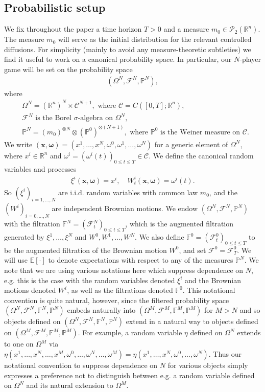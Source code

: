 \documentclass[11pt,reqno]{amsart}
\numberwithin{equation}{section}
\theoremstyle{definition}
\def\E{{\mathbb E}}
\def\R{{\mathbb R}}
\newcommand{\bx}{\mathbf{x}}
\newcommand{\bP}{\mathbb{P}}
\newcommand{\spt}{\mathcal{P}_2(\R^n)}
\newcommand{\sF}{\mathcal{F}}
\newcommand{\bbF}{\mathbb{F}}
\newcommand\cC{\mathcal C}
\def \E{\mathbb{E}}
\def \R{\mathbb{R}}
\begin{document}
\subsection{Probabilistic setup}
\label{subsec:probsetup}
We fix throughout the paper a time horizon $T > 0$ and a measure $m_0 \in \spt$. The measure $m_0$ will serve as the initial distribution for the relevant controlled diffusions. For simplicity (mainly to avoid any measure-theoretic subtleties) we find it useful to work on a canonical probability space. In particular, our $N$-player game will be set on the probability space 
\begin{align*}
(\Omega^N, \sF^N, \bP^N),
\end{align*}
where 
\begin{align*}
&\Omega^N = (\R^n)^N \times \cC^{N+1}, \text{ where } \cC = C([0,T]; \R^n), \\
&\sF^N \text{ is the Borel $\sigma$-algebra on $\Omega^N$}, \\
&\bP^N = (m_0)^{\otimes N} \otimes (\bP^0)^{\otimes (N+1)}, \text{ where $\bP^0$ is the Weiner measure on $\cC$.}
\end{align*}
We write $(\bx, \bm \omega) = (x^1,\dots,x^N, \omega^0, \omega^1,\dots,\omega^N)$ for a generic element of $\Omega^N$, where $x^i \in \R^n$ and $\omega^i = (\omega^i(t))_{0 \leq t \leq T} \in \cC$. We define the canonical random variables and processes 
\begin{align*}
\xi^i(\bx, \bm \omega) = x^i, \quad W^i_t(\bx, \bm \omega) = \omega^i(t).
\end{align*}
So $(\xi^i)_{i = 1,\dots,N}$ are i.i.d. random variables with common law $m_0$, and the $(W^i)_{i = 0,\dots,N}$ are independent Brownian motions. We endow $(\Omega^N, \sF^N, \bP^N)$ with the filtration $\bbF^N = (\sF^N_t)_{0 \leq t \leq T}$, which is the augmented filtration generated by $\xi^1,\dots,\xi^N$ and $W^0, W^1,\dots,W^N$. We also define $\bbF^0 = (\sF^0_t)_{0 \leq t \leq T}$ to be the augmented filtration of the Brownian motion $W^0$, and set $\sF^0 = \sF^0_T$. We will use $\E[\cdot]$ to denote expectations with respect to any of the measures $\bP^N$. We note that we are using various notations here which suppress dependence on $N$, e.g. this is the case with the random variables denoted $\xi^i$ and the Brownian motions denoted $W^i$, as well as the filtrations denoted $\bbF^0$. This notational convention is quite natural, however, since the filtered probability space $(\Omega^N,\sF^N,\bbF^N, \bP^N)$ embeds naturally into $(\Omega^M,\sF^M,\bbF^M, \bP^M)$ for $M >  N$ and so objects defined on $(\Omega^N,\sF^N,\bbF^N, \bP^N)$ extend in a natural way to objects defined on $(\Omega^M,\sF^M,\bbF^M, \bP^M)$. For example, a random variable $\eta$ defined on $\Omega^N$ extends to one on $\Omega^M$ via $\eta(x^1,\dots,x^N,\dots,x^M, \omega^0,\dots,\omega^N,\dots,\omega^M) = \eta(x^1,\dots,x^N, \omega^0,\dots,\omega^N)$. Thus our notational convention to suppress dependence on $N$ for various objects simply expresses a preference not to distinguish between e.g. a random variable defined on $\Omega^N$ and its natural extension to $\Omega^M$. 
\end{document}
